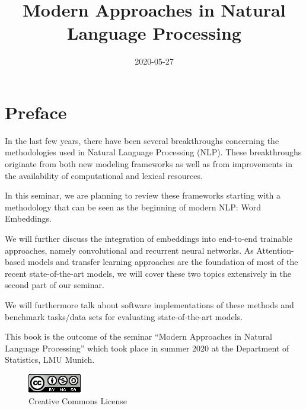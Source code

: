 \documentclass[]{krantz}
\title{Modern Approaches in Natural Language Processing}
\author{}
\date{\vspace{-2.5em}2020-05-27}
\begin{document}
\maketitle


\thispagestyle{empty}

\begin{center}
\end{center}

\setlength{\abovedisplayskip}{-5pt}
\setlength{\abovedisplayshortskip}{-5pt}

{
\hypersetup{linkcolor=}
\setcounter{tocdepth}{0}
\tableofcontents
}
\hypertarget{preface}{%
\chapter*{Preface}\label{preface}}


In the last few years, there have been several breakthroughs concerning the methodologies used in Natural Language Processing (NLP). These breakthroughs originate from both new modeling frameworks as well as from improvements in the availability of computational and lexical resources.

In this seminar, we are planning to review these frameworks starting with a methodology that can be seen as the beginning of modern NLP: Word Embeddings.

We will further discuss the integration of embeddings into end-to-end trainable approaches, namely convolutional and recurrent neural networks. As Attention-based models and transfer learning approaches are the foundation of most of the recent state-of-the-art models, we will cover these two topics extensively in the second part of our seminar.

We will furthermore talk about software implementations of these methods and benchmark tasks/data sets for evaluating state-of-the-art models.

This book is the outcome of the seminar ``Modern Approaches in Natural Language Processing'' which took place in summer 2020 at the Department of Statistics, LMU Munich.

\begin{figure}
\centering
\includegraphics{figures/by-nc-sa.png}
\caption{Creative Commons License}
\end{figure}
\end{document}
